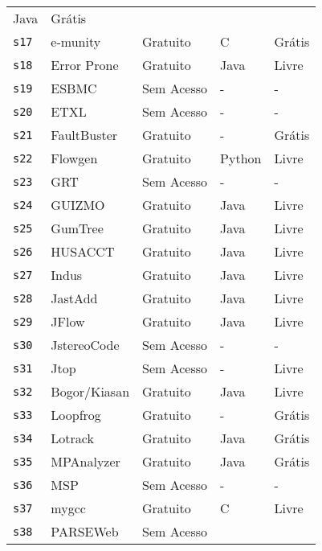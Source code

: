 \begin{longtable}{l l l p{3cm} l}
      Java &
      Grátis \\
    \texttt{s17} &
      e-munity &
      Gratuito &
      C &
      Grátis \\
    \texttt{s18} &
      Error Prone &
      Gratuito &
      Java &
      Livre \\
    \texttt{s19} &
      ESBMC &
      Sem Acesso &
      - &
      - \\
    \texttt{s20} &
      ETXL &
      Sem Acesso &
      - &
      - \\
    \texttt{s21} &
      FaultBuster &
      Gratuito &
      - &
      Grátis \\
    \texttt{s22} &
      Flowgen &
      Gratuito &
      Python &
      Livre \\
    \texttt{s23} &
      GRT &
      Sem Acesso &
      - &
      - \\
    \texttt{s24} &
      GUIZMO &
      Gratuito &
      Java &
      Livre \\
    \texttt{s25} &
      GumTree &
      Gratuito &
      Java &
      Livre \\
    \texttt{s26} &
      HUSACCT &
      Gratuito &
      Java &
      Livre \\
    \texttt{s27} &
      Indus &
      Gratuito &
      Java &
      Livre \\
    \texttt{s28} &
      JastAdd &
      Gratuito &
      Java &
      Livre \\
    \texttt{s29} &
      JFlow &
      Gratuito &
      Java &
      Livre \\
    \texttt{s30} &
      JstereoCode &
      Sem Acesso &
      - &
      - \\
    \texttt{s31} &
      Jtop &
      Sem Acesso &
      - &
      Livre \\
    \texttt{s32} &
      Bogor/Kiasan &
      Gratuito &
      Java &
      Livre \\
    \texttt{s33} &
      Loopfrog &
      Gratuito &
      - &
      Grátis \\
    \texttt{s34} &
      Lotrack &
      Gratuito &
      Java &
      Grátis \\
    \texttt{s35} &
      MPAnalyzer &
      Gratuito &
      Java &
      Grátis \\
    \texttt{s36} &
      MSP &
      Sem Acesso &
      - &
      - \\
    \texttt{s37} &
      mygcc &
      Gratuito &
      C &
      Livre \\
    \texttt{s38} &
      PARSEWeb &
      Sem Acesso &

\end{longtable}
